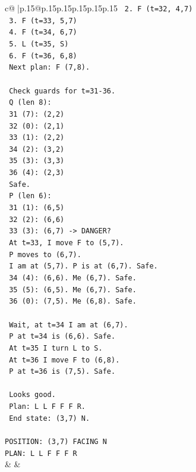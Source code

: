 \documentclass{article}
\begin{document}
{\begin{supertabular}{c@{$\;$}|p{.15\linewidth}@{}p{.15\linewidth}p{.15\linewidth}p{.15\linewidth}p{.15\linewidth}p{.15\linewidth}}
{{{\texttt{   2. F (t=32, 4,7)} \\
\texttt{   3. F (t=33, 5,7)} \\
\texttt{   4. F (t=34, 6,7)} \\
\texttt{   5. L (t=35, S)} \\
\texttt{   6. F (t=36, 6,8)} \\
\texttt{   Next plan: F (7,8).} \\
\\ 
\texttt{   Check guards for t=31{-}36.} \\
\texttt{   Q (len 8):} \\
\texttt{   31 (7): (2,2)} \\
\texttt{   32 (0): (2,1)} \\
\texttt{   33 (1): (2,2)} \\
\texttt{   34 (2): (3,2)} \\
\texttt{   35 (3): (3,3)} \\
\texttt{   36 (4): (2,3)} \\
\texttt{   Safe.} \\
\texttt{   P (len 6):} \\
\texttt{   31 (1): (6,5)} \\
\texttt{   32 (2): (6,6)} \\
\texttt{   33 (3): (6,7) {-}> DANGER?} \\
\texttt{   At t=33, I move F to (5,7).} \\
\texttt{   P moves to (6,7).} \\
\texttt{   I am at (5,7). P is at (6,7). Safe.} \\
\texttt{   34 (4): (6,6). Me (6,7). Safe.} \\
\texttt{   35 (5): (6,5). Me (6,7). Safe.} \\
\texttt{   36 (0): (7,5). Me (6,8). Safe.} \\
\\ 
\texttt{   Wait, at t=34 I am at (6,7).} \\
\texttt{   P at t=34 is (6,6). Safe.} \\
\texttt{   At t=35 I turn L to S.} \\
\texttt{   At t=36 I move F to (6,8).} \\
\texttt{   P at t=36 is (7,5). Safe.} \\
\\ 
\texttt{   Looks good.} \\
\texttt{   Plan: L L F F F R.} \\
\texttt{   End state: (3,7) N.} \\
\\ 
\texttt{POSITION: (3,7) FACING N} \\
\texttt{PLAN: L L F F F R} \\
            }
        }
    }
    & & \\ \\


\end{supertabular}}
\end{document}
